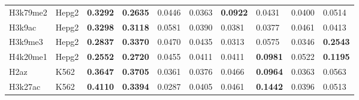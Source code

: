 \begin{table}[!ht]
\begin{tabular}{ll|ll|ll|ll|ll}
H3k79me2                             & Hepg2                                  & {\color[HTML]{CB0000} \textbf{0.3292}}                       & {\color[HTML]{CB0000} \textbf{0.2635}}                      & 0.0446                                & 0.0363                               & \textbf{0.0922}                       & 0.0431                                 & 0.0400                                & 0.0514                                 \\
H3k9ac                               & Hepg2                                  & {\color[HTML]{CB0000} \textbf{0.3298}}                       & {\color[HTML]{CB0000} \textbf{0.3118}}                      & 0.0581                                & 0.0390                               & 0.0381                                & 0.0377                                 & 0.0461                                & 0.0413                                 \\
H3k9me3                              & Hepg2                                  & {\color[HTML]{CB0000} \textbf{0.2837}}                       & {\color[HTML]{CB0000} \textbf{0.3370}}                      & 0.0470                                & 0.0435                               & 0.0313                                & 0.0575                                 & 0.0346                                & \textbf{0.2543}                        \\
H4k20me1                             & Hepg2                                  & {\color[HTML]{CB0000} \textbf{0.2552}}                       & {\color[HTML]{CB0000} \textbf{0.2720}}                      & 0.0455                                & 0.0411                               & 0.0411                                & \textbf{0.0981}                        & 0.0522                                & {\color[HTML]{CB0000} \textbf{0.1195}} \\
H2az                                 & K562                                   & {\color[HTML]{CB0000} \textbf{0.3647}}                       & {\color[HTML]{CB0000} \textbf{0.3705}}                      & 0.0361                                & 0.0376                               & 0.0466                                & \textbf{0.0964}                        & 0.0363                                & 0.0563                                 \\
H3k27ac                              & K562                                   & {\color[HTML]{CB0000} \textbf{0.4110}}                       & {\color[HTML]{CB0000} \textbf{0.3394}}                      & 0.0287                                & 0.0405                               & 0.0461                                & {\color[HTML]{CB0000} \textbf{0.1442}} & 0.0396                                & 0.0513                                 \\

\end{tabular}
\end{table}
